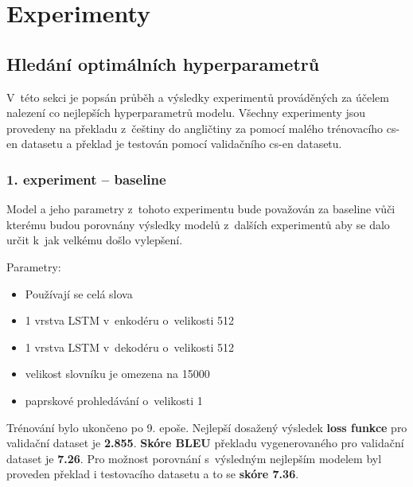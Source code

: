 \section{Experimenty}

\subsection{Hledání optimálních hyperparametrů}\label{subsection:experimentsOptimal}
V~této sekci je popsán průběh a výsledky experimentů prováděných za účelem nalezení co nejlepších hyperparametrů modelu. Všechny experimenty jsou provedeny na překladu z~češtiny do angličtiny za pomocí malého trénovacího cs-en datasetu a překlad je testován pomocí validačního cs-en datasetu.

\subsubsection{1. experiment -- baseline}\label{experiment1}
Model a jeho parametry z~tohoto experimentu bude považován za baseline vůči kterému budou porovnány výsledky modelů z~dalších experimentů aby se dalo určit k~jak velkému došlo vylepšení.

Parametry:
\begin{itemize}
  \item Používají se celá slova
  \item 1 vrstva LSTM v~enkodéru o~velikosti 512
  \item 1 vrstva LSTM v~dekodéru o~velikosti 512
  \item velikost slovníku je omezena na 15000
  \item paprskové prohledávání o~velikosti 1
\end{itemize}

Trénování bylo ukončeno po 9. epoše. Nejlepší dosažený výsledek \textbf{loss funkce} pro validační dataset je \textbf{2.855}. \textbf{Skóre BLEU} překladu vygenerovaného pro validační dataset je \textbf{7.26}. Pro možnost porovnání s~výsledným nejlepším modelem byl proveden překlad i testovacího datasetu a to se \textbf{skóre 7.36}.

